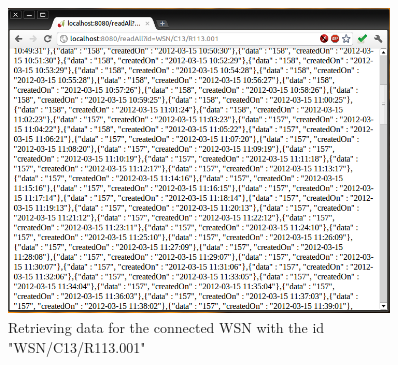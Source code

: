 \begin{figure}[H]
   \centering
   \includegraphics[width=0.9\textwidth]{pic/Web-server-readAll.png}%
   \caption{Retrieving data for the connected WSN with the id "WSN/C13/R113.001"}
   \label{web-server-readall-pic}%
\end{figure}